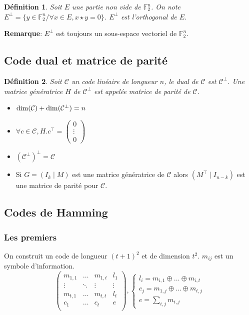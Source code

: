 \documentclass[a4paper,10pt,twocolumn]{article}
\theoremstyle{break}
\newtheorem{mydef}{Définition}
\newenvironment{note}[1]
{\textbf{#1}:}
{}
\newenvironment{remarque}
{\begin{note}{Remarque}}
{\end{note}}
\begin{document}
\begin{mydef}
 Soit $E$ une partie non vide de $\mathbb{F}_2^n$. On note $E^\bot = \lbrace y \in \mathbb{F}_2^n / \forall x \in E, x \star y = 0 \rbrace$.
 $E^\bot$ est l'orthogonal de $E$.
\end{mydef}

\begin{remarque}
 $E^\bot$ est toujours un sous-espace vectoriel de $\mathbb{F}_2^n$.
\end{remarque}


\subsection{Code dual et matrice de parité}
\begin{mydef}
 Soit $\mathcal{C}$ un code linéaire de longueur $n$, le dual de $\mathcal{C}$ est $\mathcal{C}^\bot$.
 Une matrice génératrice $H$ de $\mathcal{C}^\bot$ est appelée matrice de parité de $\mathcal{C}$.
\end{mydef}

\begin{itemize}
 \item ${\rm dim}(\mathcal{C}) + {\rm dim}(\mathcal{C}^\bot) = n$
 \item $\forall c \in \mathcal{C}, H.c^\top = \left(\begin{array}{c} 0 \\ \vdots \\ 0 \end{array}\right) $
 \item $(\mathcal{C}^\bot)^\bot = \mathcal{C}$
 \item Si $G = (I_k \mid M)$ est une matrice génératrice de $\mathcal{C}$ alors $(M^\top \mid I_{n-k})$ est une matrice de parité pour $\mathcal{C}$.
\end{itemize}

\subsection{Codes de Hamming}

\subsubsection{Les \flqq premiers\frqq}
On construit un code de longueur $(t+1)^2$ et de dimension $t^2$. $m_{ij}$ est un symbole d'information.
$$ \left(
\begin{array}{cccc}
 m_{1,1} & \ldots & m_{1,t} & l_1 \\
 \vdots & \ddots & \vdots & \vdots \\
 m_{t,1} & \ldots & m_{t,t} & l_t \\
 c_1 & \ldots & c_t & e \\
\end{array}
\right), 
\left\lbrace
\begin{array}{l}
 l_i = m_{i,1} \oplus \ldots \oplus m_{i,t} \\
 c_j = m_{1,j} \oplus \ldots \oplus m_{t,j} \\
 e = \sum_{i,j} m_{i,j}
\end{array}
\right.
$$
\end{document}
